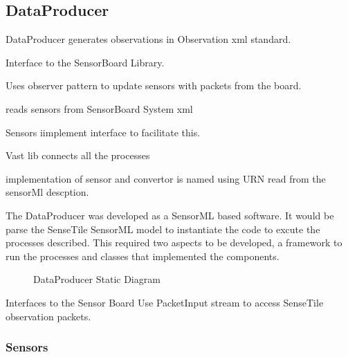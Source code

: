 \documentclass[]{final_report}
\begin{document}
\newpage
\subsection{DataProducer}

DataProducer generates observations in Observation xml standard.

Interface to the SensorBoard Library.

Uses observer pattern to update sensors with packets from the board.

reads sensors from SensorBoard System xml

Sensors iimplement interface to facilitate this.

Vast lib connects all the processes

implementation of sensor and convertor is named using URN read from the sensorMl descption.


The DataProducer was developed as a SensorML based software. It would be parse the SenseTile SensorML model to instantiate the code to excute the processes described. This required two aspects to be developed, a framework to run the processes and classes that implemented the components.

\begin{figure}[h]
\caption{DataProducer Static Diagram}\label{fig:sensetile_static_diagam.png}
\end{figure}

Interfaces to the Sensor Board
Use PacketInput stream to access SenseTile observation packets.

\subsubsection{Sensors}
\end{document}
